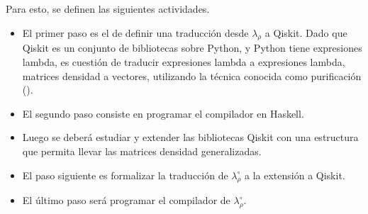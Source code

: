 \documentclass[a4paper]{article}
\begin{document}
Para esto, se definen las siguientes actividades.
\begin{itemize}
\item El primer paso es el de definir una traducción desde $\lambda_\rho$ a
  Qiskit. Dado que Qiskit es un conjunto de bibliotecas sobre Python, y Python
  tiene expresiones lambda, es cuestión de traducir expresiones lambda a
  expresiones lambda, matrices densidad a vectores, utilizando la técnica
  conocida como purificación (\cite[Cap.~I, Sec.~2.5]{NielsenChuang10}).
\item El segundo paso consiste en programar el compilador en Haskell.
\item Luego se deberá estudiar y extender las bibliotecas Qiskit con
  una estructura que permita llevar las matrices densidad generalizadas.
\item El paso siguiente es formalizar la traducción de $\lambda_\rho^\circ$ a la
  extensión a Qiskit.
\item El último paso será programar el compilador de $\lambda_\rho^\circ$.
\end{itemize}


 
\end{document}
